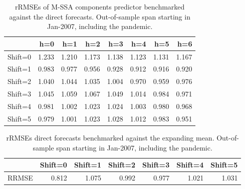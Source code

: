 \documentclass[a4paper]{article}
\begin{document}
\begin{table}[ht]
\centering
\begin{tabular}{rrrrrrrr}
  \hline
 & h=0 & h=1 & h=2 & h=3 & h=4 & h=5 & h=6 \\ 
  \hline
Shift=0 & 1.233 & 1.210 & 1.173 & 1.138 & 1.123 & 1.131 & 1.167 \\ 
  Shift=1 & 0.983 & 0.977 & 0.956 & 0.928 & 0.912 & 0.916 & 0.920 \\ 
  Shift=2 & 1.040 & 1.044 & 1.035 & 1.004 & 0.970 & 0.959 & 0.976 \\ 
  Shift=3 & 1.045 & 1.059 & 1.067 & 1.049 & 1.014 & 0.984 & 0.971 \\ 
  Shift=4 & 0.981 & 1.002 & 1.023 & 1.024 & 1.003 & 0.980 & 0.968 \\ 
  Shift=5 & 0.979 & 1.001 & 1.023 & 1.028 & 1.012 & 0.983 & 0.951 \\ 
   \hline
\end{tabular}
\caption{rRMSEs of M-SSA components predictor benchmarked against the direct forecasts. Out-of-sample span starting in Jan-2007, including the pandemic.} 
\label{rRMSE_mSSA_comp_direct3}
\end{table}%
\begin{table}[ht]
\centering
\begin{tabular}{rrrrrrr}
  \hline
 & Shift=0 & Shift=1 & Shift=2 & Shift=3 & Shift=4 & Shift=5 \\ 
  \hline
RRMSE & 0.812 & 1.075 & 0.992 & 0.977 & 1.021 & 1.031 \\ 
   \hline
\end{tabular}
\caption{rRMSEs direct forecasts benchmarked against the expanding mean. Out-of-sample span starting in Jan-2007, including the pandemic.} 
\label{rRMSE_mSSA_direct_mean4}
\end{table}
\end{document}
